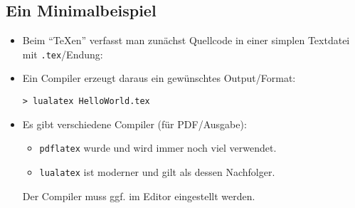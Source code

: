 \subsection{Ein Minimalbeispiel}

\begin{frame}[fragile]{\subsecname}
    \begin{itemize}
        \item Beim \enquote{\TeX{}en} verfasst man zunächst \alert{Quellcode} in einer simplen
            Textdatei mit \texttt{.tex}\-/Endung:
        \item Ein \alert{Compiler} erzeugt daraus ein gewünschtes Output\-/Format:
            \begin{center}
                \texttt{> lualatex HelloWorld.tex}
            \end{center}
        \item Es gibt verschiedene Compiler (für PDF\-/Ausgabe):
            \begin{itemize}
                \item \alert{\texttt{pdflatex}} wurde und wird immer noch viel verwendet.
                \item \alert{\texttt{lualatex}} ist moderner und gilt als dessen Nachfolger.
            \end{itemize}
            Der Compiler muss ggf. im Editor eingestellt werden.
    \end{itemize}
\end{frame}
